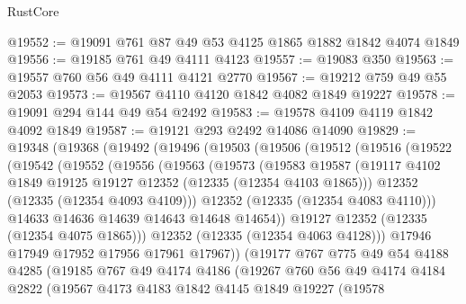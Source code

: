 \begin{lexlean}{RustCore}
\begin{coremodule}
@19552 := @19091 @761 @87 @49 @53 @4125 @1865 @1882 @1842 @4074 @1849
@19556 := @19185 @761 @49 @4111 @4123
@19557 := @19083 @350
@19563 := @19557 @760 @56 @49 @4111 @4121 @2770
@19567 := @19212 @759 @49 @55 @2053
@19573 := @19567 @4110 @4120 @1842 @4082 @1849 @19227
@19578 := @19091 @294 @144 @49 @54 @2492
@19583 := @19578 @4109 @4119 @1842 @4092 @1849
@19587 := @19121 @293 @2492 @14086 @14090
@19829 := @19348
    (@19368
      (@19492
        (@19496
          (@19503
            (@19506
              (@19512
                (@19516
                  (@19522
                    (@19542
                      (@19552
                        (@19556
                          (@19563
                            (@19573
                              (@19583
                                @19587
                                (@19117
                                  @4102
                                  @1849
                                  @19125
                                  @19127
                                  @12352
                                  (@12335 (@12354 @4103 @1865)))
                                @12352
                                (@12335 (@12354 @4093 @4109)))
                              @12352
                              (@12335 (@12354 @4083 @4110)))
                            @14633
                            @14636
                            @14639
                            @14643
                            @14648
                            @14654))
                        @19127
                        @12352
                        (@12335 (@12354 @4075 @1865)))
                      @12352
                      (@12335 (@12354 @4063 @4128)))
                    @17946
                    @17949
                    @17952
                    @17956
                    @17961
                    @17967))
                (@19177
                  @767
                  @775
                  @49
                  @54
                  @4188
                  @4285
                  (@19185
                    @767
                    @49
                    @4174
                    @4186
                    (@19267
                      @760
                      @56
                      @49
                      @4174
                      @4184
                      @2822
                      (@19567
                        @4173
                        @4183
                        @1842
                        @4145
                        @1849
                        @19227
                        (@19578

\end{coremodule}
\end{lexlean}
